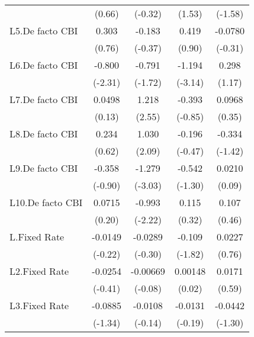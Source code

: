 {\begin{longtable}{l*{4}{c}}
                &   (0.66)         &  (-0.32)         &   (1.53)         &  (-1.58)         \\
[1em]
L5.De facto CBI &    0.303         &   -0.183         &    0.419         &  -0.0780         \\
                &   (0.76)         &  (-0.37)         &   (0.90)         &  (-0.31)         \\
[1em]
L6.De facto CBI &   -0.800\sym{*}  &   -0.791         &   -1.194\sym{**} &    0.298         \\
                &  (-2.31)         &  (-1.72)         &  (-3.14)         &   (1.17)         \\
[1em]
L7.De facto CBI &   0.0498         &    1.218\sym{*}  &   -0.393         &   0.0968         \\
                &   (0.13)         &   (2.55)         &  (-0.85)         &   (0.35)         \\
[1em]
L8.De facto CBI &    0.234         &    1.030\sym{*}  &   -0.196         &   -0.334         \\
                &   (0.62)         &   (2.09)         &  (-0.47)         &  (-1.42)         \\
[1em]
L9.De facto CBI &   -0.358         &   -1.279\sym{**} &   -0.542         &   0.0210         \\
                &  (-0.90)         &  (-3.03)         &  (-1.30)         &   (0.09)         \\
[1em]
L10.De facto CBI&   0.0715         &   -0.993\sym{*}  &    0.115         &    0.107         \\
                &   (0.20)         &  (-2.22)         &   (0.32)         &   (0.46)         \\
[1em]
L.Fixed Rate    &  -0.0149         &  -0.0289         &   -0.109         &   0.0227         \\
                &  (-0.22)         &  (-0.30)         &  (-1.82)         &   (0.76)         \\
[1em]
L2.Fixed Rate   &  -0.0254         & -0.00669         &  0.00148         &   0.0171         \\
                &  (-0.41)         &  (-0.08)         &   (0.02)         &   (0.59)         \\
[1em]
L3.Fixed Rate   &  -0.0885         &  -0.0108         &  -0.0131         &  -0.0442         \\
                &  (-1.34)         &  (-0.14)         &  (-0.19)         &  (-1.30)         \\

\end{longtable}}
